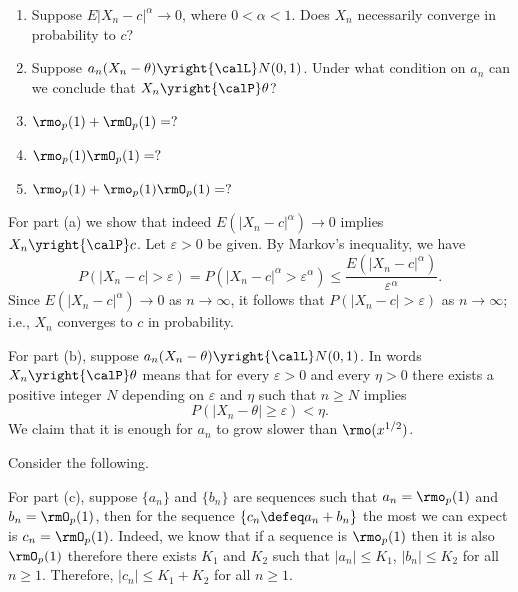 \begin{problem}[DasGupta 7.2 (a), (b), (c), (d), (e)]
  \begin{enumerate}[label=(\alph*),noitemsep]
  \item Suppose \(E|X_n-c|^\alpha\to 0\), where \(0<\alpha<1\). Does
    \(X_n\) necessarily converge in probability to \(c\)?
  \item Suppose \(a_n(X_n-\theta)\yright{\calL}N(0,1)\). Under what
    condition on \(a_n\) can we conclude that \(X_n\yright{\calP}\theta\)?
  \item \(\rmo_p(1)+\rmO_p(1)=?\)
  \item \(\rmo_p(1)\rmO_p(1)=?\)
  \item \(\rmo_p(1)+\rmo_p(1)\rmO_p(1)=?\)
  \end{enumerate}
\end{problem}
\begin{solution}
  For part (a) we show that indeed \(E(|X_n-c|^\alpha)\to 0\) implies
  \(X_n\yright{\calP}c\). Let \(\varepsilon>0\) be given. By Markov's
  inequality, we have
  \[
    P(|X_n-c|>\varepsilon)=
    P(|X_n-c|^\alpha>\varepsilon^\alpha)
    \leq\frac{E(|X_n-c|^\alpha)}{\varepsilon^\alpha}.
  \]
  Since \(E(|X_n-c|^\alpha)\to 0\) as \(n\to\infty\), it follows that
  \(P(|X_n-c|>\varepsilon)\) as \(n\to\infty\); i.e., \(X_n\) converges to
  \(c\) in probability.

  For part (b), suppose \(a_n(X_n-\theta)\yright{\calL}N(0,1)\). In words
  \(X_n\yright{\calP}\theta\) means that for every \(\varepsilon>0\) and
  every \(\eta>0\) there exists a positive integer \(N\) depending on
  \(\varepsilon\) and \(\eta\) such that \(n\geq N\) implies
  \[
    P(|X_n-\theta|\geq\varepsilon)<\eta.
  \]
  We claim that it is enough for \(a_n\) to grow slower than
  \(\rmo(x^{1/2})\).
  \begin{solution*}
    \renewcommand\qedsymbol{$\scriptstyle\clubsuit$}
    Consider the following.
  \end{solution*}

  For part (c), suppose \(\{a_n\}\) and \(\{b_n\}\) are sequences such that
  \(a_n=\rmo_p(1)\) and \(b_n=\rmO_p(1)\), then for the sequence
  \(\{c_n\defeq a_n+b_n\}\) the most we can expect is
  \(c_n=\rmO_p(1)\). Indeed, we know that if a sequence is \(\rmo_p(1)\)
  then it is also \(\rmO_p(1)\) therefore there exists \(K_1\) and \(K_2\)
  such that \(|a_n|\leq K_1\), \(|b_n|\leq K_2\) for all \(n\geq
  1\). Therefore, \(|c_n|\leq K_1+K_2\) for all \(n\geq 1\).
\end{solution}
\newpage

